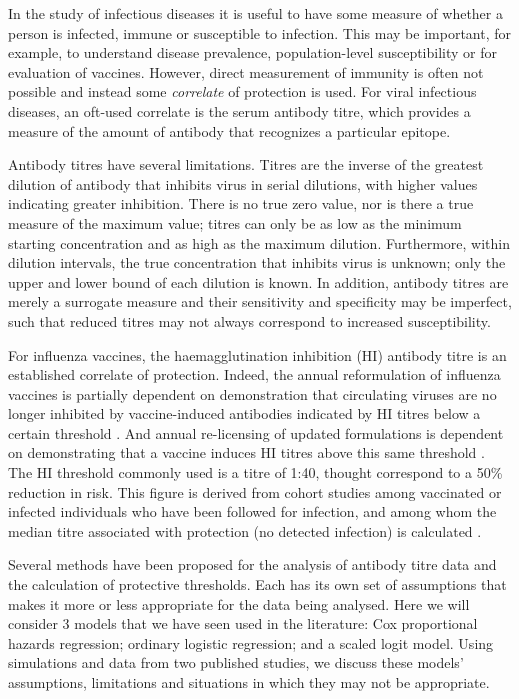 In the study of infectious diseases it is useful to have some measure of whether a person is infected, immune or susceptible to infection. This may be important, for example, to understand disease prevalence, population-level susceptibility or for evaluation of vaccines.  However, direct measurement of immunity is often not possible and instead some \textit{correlate} of protection is used. For viral infectious diseases, an oft-used correlate is the serum antibody titre, which provides a measure of the amount of antibody that recognizes a particular epitope. 

Antibody titres have several limitations. Titres are the inverse of the greatest dilution of antibody that inhibits virus in serial dilutions, with higher values indicating greater inhibition. There is no true zero value, nor is there a true measure of the maximum value; titres can only be as low as the minimum starting concentration and as high as the maximum dilution.  Furthermore, within dilution intervals, the true concentration that inhibits virus is unknown; only the upper and lower bound of each dilution is known. In addition, antibody titres are merely a surrogate measure and their sensitivity and specificity may be imperfect, such that reduced titres may not always correspond to increased susceptibility. 

For influenza vaccines, the haemagglutination inhibition (HI) antibody titre is an established correlate of protection. Indeed, the annual reformulation of influenza vaccines is partially dependent on demonstration that circulating viruses are no longer inhibited by vaccine-induced antibodies indicated by HI titres below a certain threshold \citep{Barr;2014}. And annual re-licensing of updated formulations is dependent on demonstrating that a vaccine induces HI titres above this same threshold \citep{Wood;2003}.  The HI threshold commonly used is a titre of 1:40, thought correspond to a 50\% reduction in risk. This figure is derived from cohort studies among vaccinated or infected individuals who have been followed for infection, and among whom the median titre associated with protection (no detected infection) is calculated \citep{Hobson;1972}\citep{Ng;2013}. 


Several methods have been proposed for the analysis of antibody titre data and the calculation of protective thresholds. Each has its own set of assumptions that makes it more or less appropriate for the data being analysed. Here we will consider 3 models that we have seen used in the literature: Cox proportional hazards regression; ordinary logistic regression; and a scaled logit model. Using simulations and data from two published studies, we discuss these models' assumptions, limitations and situations in which they may not be appropriate.
